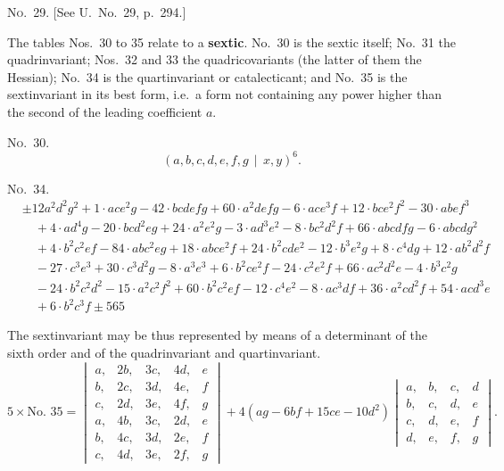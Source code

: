 \documentclass[11pt,a4paper]{article}
\begin{document}
\noindent\textsc{No.~29.} [See U.\ No.~29, p.~294.]

The tables Nos.~30 to 35 relate to a \textbf{sextic}.
No.~30 is the sextic itself; No.~31 the quadrinvariant; Nos.~32 and 33 the quadricovariants
(the latter of them the Hessian); No.~34 is the quartinvariant or catalecticant;
and No.~35 is the sextinvariant in its best form, i.e.\ a form not containing any
power higher than the second of the leading coefficient $a$.

\noindent\textsc{No.~30.}
\[(a, b, c, d, e, f, g \, \mid\, x, y)^6.\]

\noindent\textsc{No.~34.}
\begin{align*}
&\pm 12 a^2d^2g^2 + 1\cdot ace^2g - 42\cdot bcdefg + 60\cdot a^2defg - 6\cdot ace^3f + 12\cdot bce^2f^2 - 30\cdot abef^3\\
&\quad + 4\cdot ad^4g - 20\cdot bcd^2eg + 24\cdot a^2e^2g - 3\cdot ad^3e^2 - 8\cdot bc^2d^2f + 66\cdot abcdfg - 6\cdot abcdg^2\\
&\quad + 4\cdot b^2c^2ef - 84\cdot abc^2eg + 18\cdot abce^2f + 24\cdot b^2cde^2 - 12\cdot b^3e^2g + 8\cdot c^4dg + 12\cdot ab^2d^2f\\
&\quad - 27\cdot c^3e^3 + 30\cdot c^3d^2g - 8\cdot a^3e^3 + 6\cdot b^2ce^2f - 24\cdot c^2e^2f + 66\cdot ac^2d^2e - 4\cdot b^3c^2g\\
&\quad - 24\cdot b^2c^2d^2 - 15\cdot a^2c^2f^2 + 60\cdot b^2c^2ef - 12\cdot c^4e^2 - 8\cdot ac^3df + 36\cdot a^2cd^2f + 54\cdot acd^3e\\
&\quad + 6\cdot b^2c^3f \pm 565
\end{align*}

The sextinvariant may be thus represented by means of a determinant of the
sixth order and of the quadrinvariant and quartinvariant.
\[5 \times \text{No.~35} =
\begin{vmatrix}
a, & 2b, & 3c, & 4d, & e \\
b, & 2c, & 3d, & 4e, & f \\
c, & 2d, & 3e, & 4f, & g \\
a, & 4b, & 3c, & 2d, & e \\
b, & 4c, & 3d, & 2e, & f \\
c, & 4d, & 3e, & 2f, & g
\end{vmatrix}
+ 4(ag - 6bf + 15ce - 10d^2)
\begin{vmatrix}
a, & b, & c, & d \\
b, & c, & d, & e \\
c, & d, & e, & f \\
d, & e, & f, & g
\end{vmatrix}.\]
\end{document}
